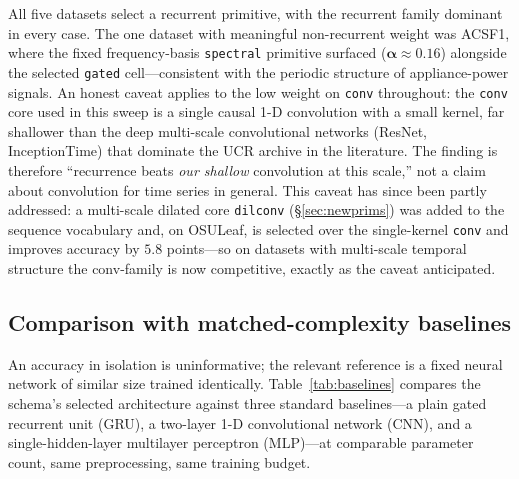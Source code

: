 \documentclass[11pt]{article}
\newcommand{\allowbreakhere}{\discretionary{}{}{}}
\newcommand{\code}[1]{\texttt{\def\_{\char`_\allowbreakhere}#1}}
\newcommand{\alphapar}{\bm{\alpha}}
\begin{document}
All five datasets select a recurrent primitive, with the recurrent family dominant in every
case. The one dataset with meaningful non-recurrent weight was ACSF1, where the fixed
frequency-basis \code{spectral} primitive surfaced ($\alphapar\approx0.16$) alongside the
selected \code{gated} cell---consistent with the periodic structure of appliance-power signals.
An honest caveat applies to the low weight on \code{conv} throughout: the \code{conv} core used
in this sweep is a single causal 1-D convolution with a small kernel, far shallower than the deep
multi-scale convolutional networks (ResNet, InceptionTime) that dominate the UCR archive in the
literature. The finding is therefore ``recurrence beats \emph{our shallow} convolution at this
scale,'' not a claim about convolution for time series in general. This caveat has since been
partly addressed: a multi-scale dilated core \code{dilconv} (\S\ref{sec:newprims}) was added to the
sequence vocabulary and, on OSULeaf, is selected over the single-kernel \code{conv} and improves
accuracy by $5.8$ points---so on datasets with multi-scale temporal structure the conv-family is
now competitive, exactly as the caveat anticipated.

\subsection{Comparison with matched-complexity baselines}
\label{sec:baselines}

An accuracy in isolation is uninformative; the relevant reference is a fixed neural network of
similar size trained identically. Table~\ref{tab:baselines} compares the schema's
selected architecture against three standard baselines---a plain gated recurrent unit (GRU), a two-layer 1-D convolutional network (CNN), and a single-hidden-layer multilayer perceptron (MLP)---at comparable parameter count, same preprocessing, same training
budget.
\end{document}
